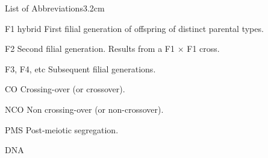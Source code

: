 
\begin{mclistof}{List of Abbreviations}{3.2cm}

\item[F1 hybrid] First filial generation of offspring of distinct parental types.
\item[F2] Second filial generation. Results from a F1 $\times$ F1 cross.
\item[F3, F4, etc] Subsequent filial generations.


\item[CO] Crossing-over (or crossover).
\item[NCO] Non crossing-over (or non-crossover).
\item[PMS] Post-meiotic segregation.
\item[DNA] 


\end{mclistof}




